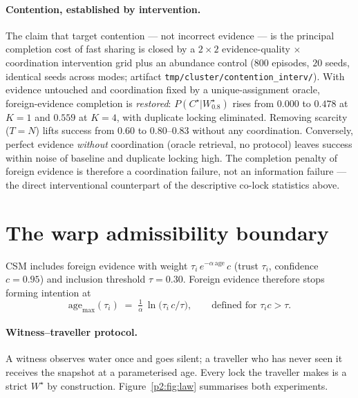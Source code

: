 \documentclass{article}
\newcommand{\wstar}{W^{\star}}
\newcommand{\cstar}{C^{\star}}
\begin{document}
\paragraph{Contention, established by intervention.} The claim that
target contention --- not incorrect evidence --- is the principal
completion cost of fast sharing is closed by a $2{\times}2$
evidence-quality $\times$ coordination intervention grid plus an
abundance control ($800$ episodes, $20$ seeds, identical seeds across
modes; artifact \texttt{tmp/cluster/contention\_interv/}). With
evidence untouched and coordination fixed by a unique-assignment
oracle, foreign-evidence completion is \emph{restored}:
$P(\cstar|\wstar_{0.8})$ rises from $0.000$ to $0.478$ at $K{=}1$ and
$0.559$ at $K{=}4$, with duplicate locking eliminated. Removing
scarcity ($T{=}N$) lifts success from $0.60$ to $0.80$--$0.83$
without any coordination. Conversely, perfect evidence \emph{without}
coordination (oracle retrieval, no protocol) leaves success within
noise of baseline and duplicate locking high. The completion penalty
of foreign evidence is therefore a coordination failure, not an
information failure --- the direct interventional counterpart of the
descriptive co-lock statistics above.


\section{The warp admissibility boundary}
\label{p2:sec:law}

CSM includes foreign evidence with weight $\tau_i\, e^{-\alpha\,
\text{age}}\, c$ (trust $\tau_i$, confidence $c{=}0.95$) and inclusion
threshold $\tau{=}0.30$. Foreign evidence therefore stops forming
intention at
\[
\mathrm{age}_{\max}(\tau_i) \;=\; \tfrac{1}{\alpha}\,
\ln\!\big(\tau_i\, c / \tau\big), \qquad \text{defined for } \tau_i c > \tau .
\]

\paragraph{Witness--traveller protocol.} A witness observes water once
and goes silent; a traveller who has never seen it receives the
snapshot at a parameterised age. Every lock the traveller makes is a
strict $\wstar$ by construction. Figure~\ref{p2:fig:law} summarises both
experiments.
\end{document}
